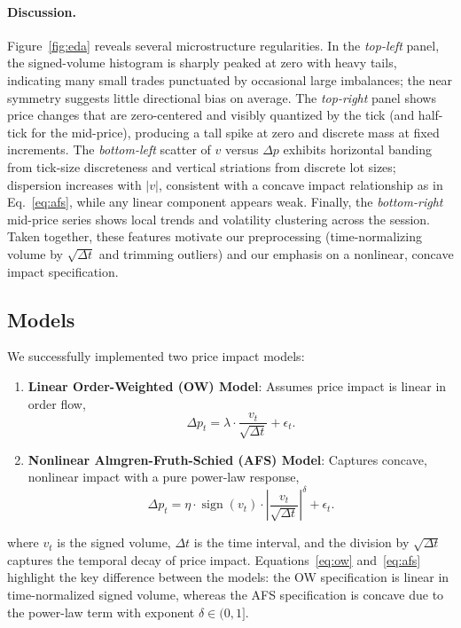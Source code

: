 \documentclass{article}
\begin{document}
\paragraph{Discussion.} Figure~\ref{fig:eda} reveals several microstructure regularities. In the \emph{top-left} panel, the signed-volume histogram is sharply peaked at zero with heavy tails, indicating many small trades punctuated by occasional large imbalances; the near symmetry suggests little directional bias on average. The \emph{top-right} panel shows price changes that are zero-centered and visibly quantized by the tick (and half-tick for the mid-price), producing a tall spike at zero and discrete mass at fixed increments. The \emph{bottom-left} scatter of $v$ versus $\Delta p$ exhibits horizontal banding from tick-size discreteness and vertical striations from discrete lot sizes; dispersion increases with $|v|$, consistent with a concave impact relationship as in Eq.~\eqref{eq:afs}, while any linear component appears weak. Finally, the \emph{bottom-right} mid-price series shows local trends and volatility clustering across the session. Taken together, these features motivate our preprocessing (time-normalizing volume by $\sqrt{\Delta t}$ and trimming outliers) and our emphasis on a nonlinear, concave impact specification.
\subsection{Models}
We successfully implemented two price impact models:

\begin{enumerate}
    \item \textbf{Linear Order-Weighted (OW) Model}: Assumes price impact is linear in order flow,
    \begin{equation}\label{eq:ow}
      \Delta p_t = \lambda \cdot \frac{v_t}{\sqrt{\Delta t}} + \epsilon_t.
    \end{equation}
    \item \textbf{Nonlinear Almgren-Fruth-Schied (AFS) Model}: Captures concave, nonlinear impact with a pure power-law response,
    \begin{equation}\label{eq:afs}
      \Delta p_t = \eta \cdot \operatorname{sign}(v_t) \cdot \left|\frac{v_t}{\sqrt{\Delta t}}\right|^\delta + \epsilon_t.
    \end{equation}
\end{enumerate}
where $v_t$ is the signed volume, $\Delta t$ is the time interval, and the division by $\sqrt{\Delta t}$ captures the temporal decay of price impact. Equations~\eqref{eq:ow} and~\eqref{eq:afs} highlight the key difference between the models: the OW specification is linear in time-normalized signed volume, whereas the AFS specification is concave due to the power-law term with exponent $\delta\in(0,1]$.
\end{document}
